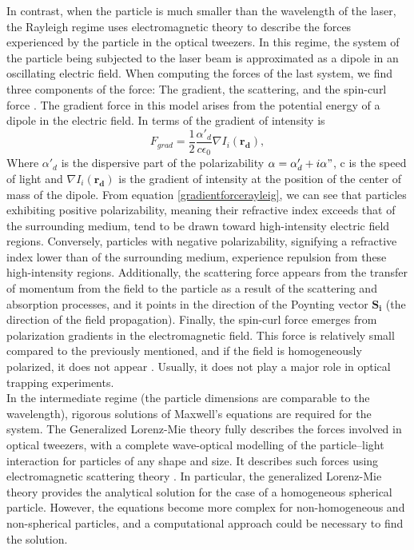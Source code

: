 \documentclass[letterpaper,12pt,oneside]{book}
\begin{document}
\newline \noindent In contrast, when the particle is much smaller than the wavelength of the laser, the Rayleigh regime uses electromagnetic theory to describe the forces experienced by the particle in the optical tweezers. 
In this regime, the system of the particle being subjected to the laser beam is approximated as a dipole in an oscillating electric field. When computing the forces of the last system, we find three components of the force: The gradient, the scattering, and the spin-curl force \cite{svelto2010principles}. The gradient force in this model arises from the potential energy of a dipole in the electric field. In terms of the gradient of intensity is \cite{svelto2010principles}
\begin{equation}
    F_{grad}=\frac{1}{2}\frac{\alpha'_d}{c\epsilon_0}\nabla I_i(\mathbf{r_d}),
    \label{gradientforcerayleig}
\end{equation}
Where $\alpha'_d$ is the dispersive part of the polarizability $\alpha=\alpha'_d + i \alpha"$, c is the speed of light and $\nabla I_i\mathbf{(r_d)}$ is the gradient of intensity at the position of the center of mass of the dipole. 
From equation \eqref{gradientforcerayleig}, we can see that particles exhibiting positive polarizability, meaning their refractive index exceeds that of the surrounding medium, tend to be drawn toward high-intensity electric field regions. Conversely, particles with negative polarizability, signifying a refractive index lower than of the surrounding medium, experience repulsion from these high-intensity regions. Additionally, the scattering force appears from the transfer of momentum from the field to the particle as a result of the scattering and absorption processes, and it points in the direction of the Poynting vector $\mathbf{S_i}$ (the direction of the field propagation). Finally, the spin-curl force emerges from polarization gradients in the electromagnetic field. This force is relatively small compared to the previously mentioned, and if the field is homogeneously polarized, it does not appear \cite{jones2015optical}. Usually, it does not play a major role in optical trapping experiments.
\\ In the intermediate regime (the particle dimensions are comparable to the wavelength), rigorous solutions of Maxwell’s equations are required for the system. The Generalized Lorenz-Mie theory fully describes the forces involved in optical tweezers, with a complete wave-optical modelling of the particle–light interaction for particles of any shape and size. It describes such forces using electromagnetic scattering theory \cite{jones2015optical}. In particular, the generalized Lorenz-Mie theory provides the analytical solution for the case of a homogeneous spherical particle. However, the equations become more complex for non-homogeneous and non-spherical particles, and a computational approach could be necessary to find the solution. 
\end{document}
